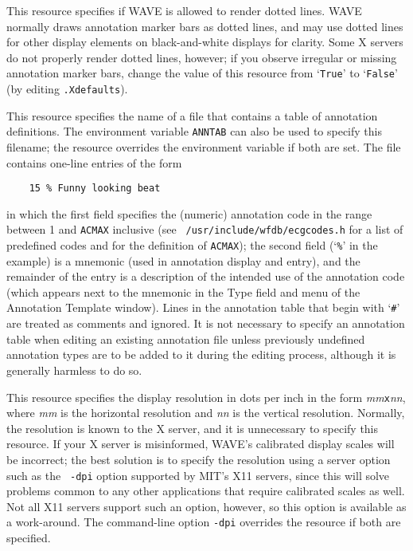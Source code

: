 \documentclass[twoside]{book}
\newcommand{\WAVE}{{\sf WAVE}\xspace}
\begin{document}
\begin{description}

\item[{\tt Wave.AllowDottedLines}]
This resource specifies if \WAVE{} is allowed to render dotted lines.  \WAVE{}
normally draws annotation marker bars as dotted lines, and may use dotted
lines for other display elements on black-and-white displays for clarity.
Some X servers do not properly render dotted lines, however;  if you
observe irregular or missing annotation marker bars, change the value of
this resource from `{\tt True}' to `{\tt False}' (by editing {\tt .Xdefaults}).

\label{anntab}
\item[{\tt Wave.Anntab}]
This resource specifies the name of a file that contains a table of
annotation definitions.  The environment variable {\tt ANNTAB} can also be used
to specify this filename;  the resource overrides the environment variable
if both are set.  The file contains one-line entries of the form
\begin{verbatim}
    15 % Funny looking beat
\end{verbatim}
in which the first field specifies the (numeric) annotation code in
the range between 1 and {\tt ACMAX} inclusive (see {\tt
/usr/include/wfdb/ecgcodes.h} for a list of predefined codes and for
the definition of {\tt ACMAX}); the second field (`{\tt \%}' in the
example) is a mnemonic (used in annotation display and entry), and the
remainder of the entry is a description of the intended use of the
annotation code (which appears next to the mnemonic in the {\sf Type}
field and menu of the {\sf Annotation Template} window).  Lines in the
annotation table that begin with `{\tt \#}' are treated as comments
and ignored.  It is not necessary to specify an annotation table when
editing an existing annotation file unless previously undefined
annotation types are to be added to it during the editing process,
although it is generally harmless to do so.

\index{dpi option for WAVE@{\tt -dpi} option for \WAVE{}}
\item[{\tt Wave.Dpi}]
This resource specifies the display resolution in dots per inch in the form
{\it mm}{\tt x}{\it nn}, where {\it mm} is the horizontal resolution and {\it
nn} is the vertical resolution.  Normally, the resolution is known to the X
server, and it is unnecessary to specify this resource.  If your X server is
misinformed, \WAVE{}'s calibrated display scales will be incorrect; the best
solution is to specify the resolution using a server option such as the {\tt
-dpi} option supported by MIT's X11 servers, since this will solve problems
common to any other applications that require calibrated scales as well.  Not
all X11 servers support such an option, however, so this option is available
as a work-around.  The command-line option {\tt -dpi} overrides the resource
if both are specified.


\end{description}
\end{document}
